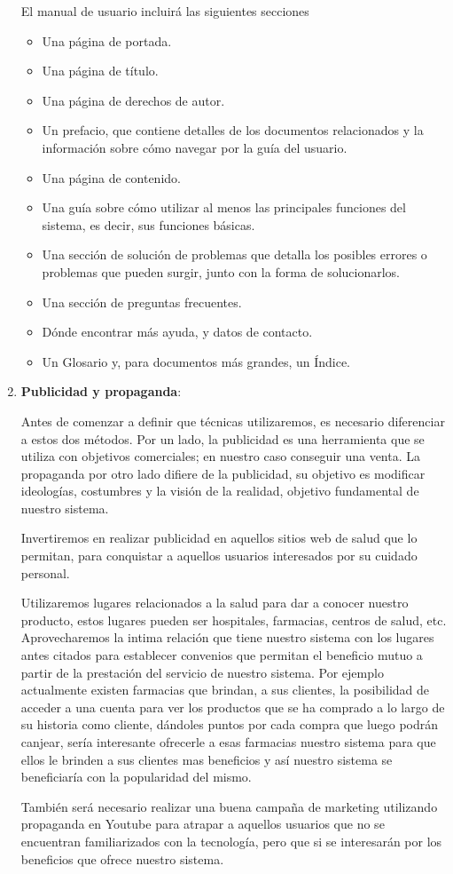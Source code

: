 \begin{enumerate}
El manual de usuario incluirá las siguientes secciones
\begin{itemize}
\item   Una página de portada.
\item   Una página de título.
\item   Una página de derechos de autor.
\item   Un prefacio, que contiene detalles de los documentos relacionados y la información sobre cómo navegar por la guía del usuario.
\item   Una página de contenido.
\item   Una guía sobre cómo utilizar al menos las principales funciones del sistema, es decir, sus funciones básicas.
\item   Una sección de solución de problemas que detalla los posibles errores o problemas que pueden surgir, junto con la forma de solucionarlos.
\item   Una sección de preguntas frecuentes.
\item   Dónde encontrar más ayuda, y datos de contacto.
\item   Un Glosario y, para documentos más grandes, un Índice.

\end{itemize}

\item \textbf{Publicidad y propaganda}:

Antes de comenzar a definir que técnicas utilizaremos, es necesario diferenciar a estos dos métodos. Por un lado, la publicidad es una herramienta que se utiliza con objetivos comerciales; en nuestro caso conseguir una venta. La propaganda por otro lado difiere de la publicidad, su objetivo es modificar ideologías, costumbres y la visión de la realidad, objetivo fundamental de nuestro sistema.

Invertiremos en realizar publicidad en aquellos sitios web de salud que lo permitan, para conquistar a aquellos usuarios interesados por su cuidado personal.

Utilizaremos lugares relacionados a la salud para dar a conocer nuestro producto, estos lugares pueden ser hospitales, farmacias, centros de salud, etc. Aprovecharemos la intima relación que tiene nuestro sistema con los lugares antes citados para establecer  convenios que permitan el beneficio mutuo  a partir de la prestación del servicio de nuestro sistema. 
Por ejemplo actualmente existen farmacias que brindan, a sus clientes, la posibilidad  de acceder a una cuenta para ver  los productos que se ha comprado a lo largo de su historia como cliente, dándoles puntos por cada compra que luego podrán canjear, sería interesante ofrecerle a esas farmacias nuestro sistema para que ellos le brinden a sus clientes mas beneficios y así nuestro sistema se beneficiaría con la popularidad del mismo.

También será necesario realizar una buena campaña de marketing utilizando propaganda en Youtube para atrapar a aquellos usuarios que no se encuentran familiarizados con la tecnología, pero que si se interesarán por los beneficios que ofrece nuestro sistema.
\end{enumerate}


